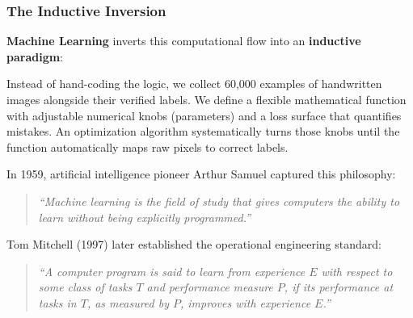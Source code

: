 \subsubsection{The Inductive Inversion}
\textbf{Machine Learning} inverts this computational flow into an \textbf{inductive paradigm}:
\begin{center}
\end{center}

Instead of hand-coding the logic, we collect 60,000 examples of handwritten images alongside their verified labels. We define a flexible mathematical function with adjustable numerical knobs (parameters) and a loss surface that quantifies mistakes. An optimization algorithm systematically turns those knobs until the function automatically maps raw pixels to correct labels.

In 1959, artificial intelligence pioneer Arthur Samuel captured this philosophy:
\begin{quote}
\emph{``Machine learning is the field of study that gives computers the ability to learn without being explicitly programmed.''}
\end{quote}
Tom Mitchell (1997) later established the operational engineering standard:
\begin{quote}
\emph{``A computer program is said to learn from experience $E$ with respect to some class of tasks $T$ and performance measure $P$, if its performance at tasks in $T$, as measured by $P$, improves with experience $E$.''}
\end{quote}

